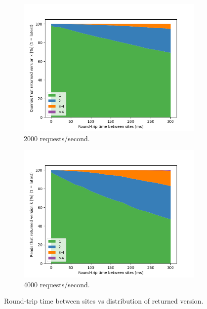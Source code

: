 \begin{figure}[H]
  \begin{subfigure}{0.5\textwidth}
    \includegraphics[width=\linewidth]{./figures/evaluation/readV_freshness_netLatency_200.png}
    \caption{2000 requests/second.}
    \label{fig:readV_freshness_netLatency_200}
  \end{subfigure}%
  \hspace*{\fill}
  \begin{subfigure}{0.5\textwidth}
    \includegraphics[width=\linewidth]{./figures/evaluation/readV_freshness_netLatency_400.png}
    \caption{4000 requests/second.}
    \label{fig:readV_freshness_netLatency_400}
  \end{subfigure}%
\caption{Round-trip time between sites vs distribution of returned version.}
\label{fig:readV_freshness_netLatency}
\end{figure}

